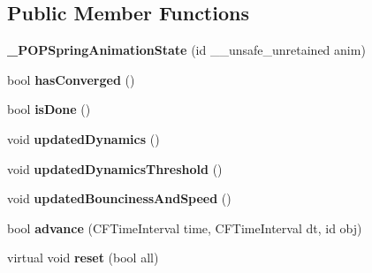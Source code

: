 \subsection*{Public Member Functions}
\begin{DoxyCompactItemize}
\item 
\mbox{\label{struct___p_o_p_spring_animation_state_a5a47179c6a2f40921d2d67de1d834fac}} 
{\bfseries \+\_\+\+P\+O\+P\+Spring\+Animation\+State} (id \+\_\+\+\_\+unsafe\+\_\+unretained anim)
\item 
\mbox{\label{struct___p_o_p_spring_animation_state_ab182ecfefc863b54017b4622530a459a}} 
bool {\bfseries has\+Converged} ()
\item 
\mbox{\label{struct___p_o_p_spring_animation_state_ac8292b4c3f19d2b3b9c55e81c226c475}} 
bool {\bfseries is\+Done} ()
\item 
\mbox{\label{struct___p_o_p_spring_animation_state_a2ec5c35f75240ef842914e16171977c0}} 
void {\bfseries updated\+Dynamics} ()
\item 
\mbox{\label{struct___p_o_p_spring_animation_state_a6f1e7b214f3099d63e44f7fa6be013e4}} 
void {\bfseries updated\+Dynamics\+Threshold} ()
\item 
\mbox{\label{struct___p_o_p_spring_animation_state_afb14f0207c42c4fb311b00fdc81fab1b}} 
void {\bfseries updated\+Bounciness\+And\+Speed} ()
\item 
\mbox{\label{struct___p_o_p_spring_animation_state_a3eefb1edc3d7a14a084ff3805f37f112}} 
bool {\bfseries advance} (C\+F\+Time\+Interval time, C\+F\+Time\+Interval dt, id obj)
\item 
\mbox{\label{struct___p_o_p_spring_animation_state_ac42ac070f25700ad6295540150fc6c75}} 
virtual void {\bfseries reset} (bool all)
\item 
\mbox{\label{struct___p_o_p_spring_animation_state_a5a47179c6a2f40921d2d67de1d834fac}} 

\end{DoxyCompactItemize}
